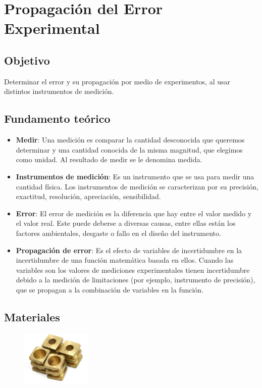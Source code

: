 \section{Propagaci\'on del Error Experimental}

\subsection{Objetivo}
Determinar el error y su propagación por medio de experimentos, al usar distintos instrumentos de medición.

\subsection{Fundamento te\'orico}
\begin{itemize}
    \item \textbf{Medir}: Una medición es comparar la cantidad desconocida que queremos determinar y una cantidad conocida de la misma magnitud, que elegimos como unidad. Al resultado de medir se le denomina medida.
    \item \textbf{Instrumentos de medición}: Es un instrumento que se usa para medir una cantidad física. Los instrumentos de medición se caracterizan por su precisión, exactitud, resolución, apreciación, sensibilidad.
    \item \textbf{Error}: El error de medición es la diferencia que hay entre el valor medido y el valor real. Este puede deberse a diversas causas, entre ellas están los factores ambientales, desgaste o fallo en el diseño del instrumento.
    \item \textbf{Propagación de error}: Es el efecto de variables de incertidumbre en la incertidumbre de una función matemática basada en ellos. Cuando las variables son los valores de mediciones experimentales tienen incertidumbre debido a la medición de limitaciones (por ejemplo, instrumento de precisión), que se propagan a la combinación de variables en la función.
\end{itemize}

\subsection{Materiales}

\begin{figure}[H]
	\begin{center}
 		\includegraphics[width = 0.3\textwidth]{Imagenes/para.jpg}
	\end{center} 
\end{figure}


